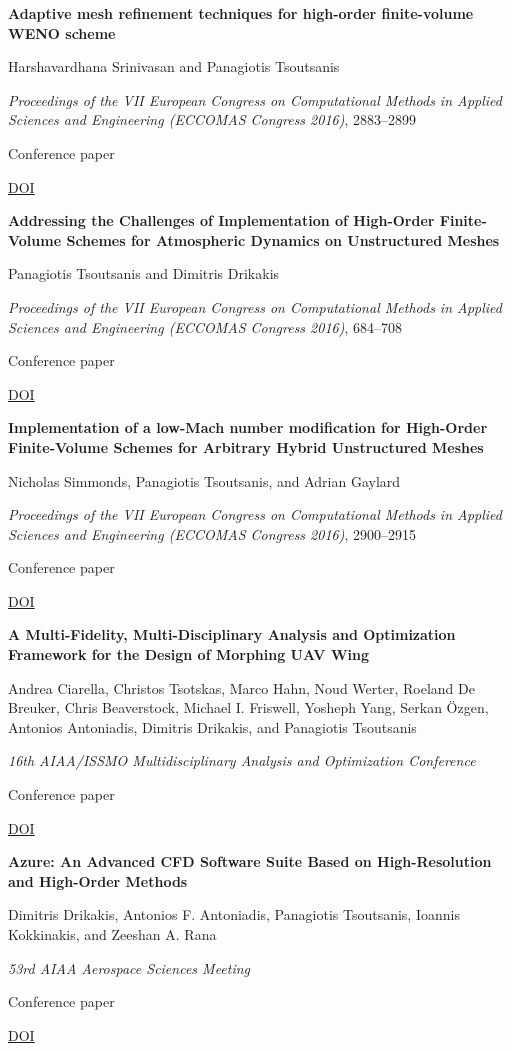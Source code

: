 \documentclass[11pt,a4paper]{article}
\newlength{\cventrysep}
\newenvironment{cventry}{%
  \par\noindent\begin{minipage}{\linewidth}
  \RaggedRight\fontsize{9.8}{12.5}\selectfont
}{\end{minipage}\par\addvspace{\cventrysep}}
\newcommand{\cvtitle}[1]{{\bfseries #1\par}\vspace{1pt}}
\newcommand{\cvdetail}[1]{{#1\par}\vspace{1pt}}
\newcommand{\cvmeta}[1]{{\fontsize{9}{11.5}\selectfont\color{Muted}#1\par}\vspace{1pt}}
\newcommand{\cvlinks}[1]{{\fontsize{9}{11.5}\selectfont #1\par}}
\newcommand{\cvyear}[1]{{\color{Teal}\bfseries\fontsize{11}{13}\selectfont #1\par}\vspace{6pt}}
\begin{document}
\begin{cventry}
\cvyear{2016}
\cvtitle{Adaptive mesh refinement techniques for high-order finite-volume WENO scheme}
\cvdetail{Harshavardhana Srinivasan and Panagiotis Tsoutsanis}
\cvmeta{\textit{Proceedings of the VII European Congress on Computational Methods in Applied Sciences and Engineering (ECCOMAS Congress 2016)}, 2883--2899\par Conference paper}
\cvlinks{\href{https://doi.org/10.7712/100016.2003.8544}{DOI}}
\end{cventry}

\begin{cventry}
\cvtitle{Addressing the Challenges of Implementation of High-Order Finite-Volume Schemes for Atmospheric Dynamics on Unstructured Meshes}
\cvdetail{Panagiotis Tsoutsanis and Dimitris Drikakis}
\cvmeta{\textit{Proceedings of the VII European Congress on Computational Methods in Applied Sciences and Engineering (ECCOMAS Congress 2016)}, 684--708\par Conference paper}
\cvlinks{\href{https://doi.org/10.7712/100016.1846.8406}{DOI}}
\end{cventry}

\begin{cventry}
\cvtitle{Implementation of a low-Mach number modification for High-Order Finite-Volume Schemes for Arbitrary Hybrid Unstructured Meshes}
\cvdetail{Nicholas Simmonds, Panagiotis Tsoutsanis, and Adrian Gaylard}
\cvmeta{\textit{Proceedings of the VII European Congress on Computational Methods in Applied Sciences and Engineering (ECCOMAS Congress 2016)}, 2900--2915\par Conference paper}
\cvlinks{\href{https://doi.org/10.7712/100016.2004.8545}{DOI}}
\end{cventry}

\begin{cventry}
\cvyear{2015}
\cvtitle{A Multi-Fidelity, Multi-Disciplinary Analysis and Optimization Framework for the Design of Morphing UAV Wing}
\cvdetail{Andrea Ciarella, Christos Tsotskas, Marco Hahn, Noud Werter, Roeland De Breuker, Chris Beaverstock, Michael I. Friswell, Yosheph Yang, Serkan Özgen, Antonios Antoniadis, Dimitris Drikakis, and Panagiotis Tsoutsanis}
\cvmeta{\textit{16th AIAA/ISSMO Multidisciplinary Analysis and Optimization Conference}\par Conference paper}
\cvlinks{\href{https://doi.org/10.2514/6.2015-2326}{DOI}}
\end{cventry}

\begin{cventry}
\cvtitle{Azure: An Advanced CFD Software Suite Based on High-Resolution and High-Order Methods}
\cvdetail{Dimitris Drikakis, Antonios F. Antoniadis, Panagiotis Tsoutsanis, Ioannis Kokkinakis, and Zeeshan A. Rana}
\cvmeta{\textit{53rd AIAA Aerospace Sciences Meeting}\par Conference paper}
\cvlinks{\href{https://doi.org/10.2514/6.2015-0813}{DOI}}
\end{cventry}
\end{document}
